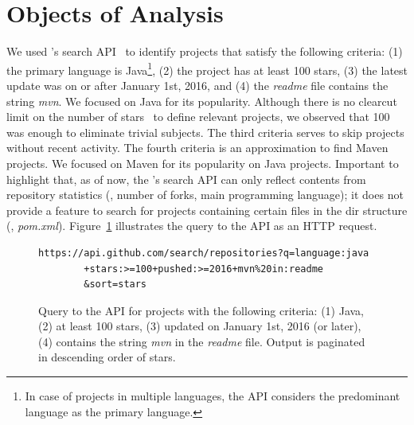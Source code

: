 \section{Objects of Analysis}
\label{sec:subjects}



We used \github{}'s search API~\cite{githubsearch} to identify
projects that satisfy the following criteria: (1) the primary language
is Java\footnote{In case of projects in multiple languages, the
  \github{} API considers the predominant language as the primary
  language.}, (2) the project has at least 100 stars, (3) the latest
update was on or after January 1st, 2016, and (4) the \emph{readme}
file contains the string \emph{mvn}.  We focused on Java for its
popularity.  Although there is no clearcut limit on the number of
\github{} stars~\cite{github-stars} to define relevant projects, we
observed that 100 was enough to eliminate trivial subjects. The third
criteria serves to skip projects without recent activity. The fourth
criteria is an approximation to find Maven projects. We focused on Maven for its popularity on
Java projects.  Important to highlight that, as of now, the
\github{}'s search API can only reflect contents from repository
statistics (\eg, number of forks, main programming language); it does
not provide a feature to search for projects containing certain files
in the dir structure (\eg{}, \emph{pom.xml}).
Figure~\ref{fig:subject-query} illustrates the query to the \github{}
API as an HTTP request.  

\vspace{1ex}
\begin{figure}[h!]
\centering
\scriptsize
{}
\begin{lstlisting}
https://api.github.com/search/repositories?q=language:java
        +stars:>=100+pushed:>=2016+mvn%20in:readme
        &sort=stars
\end{lstlisting}
  \caption{\label{fig:subject-query} Query to the \github{} API for
  projects with the following criteria: (1) Java, (2) at least 100
  stars, (3) updated on January 1st, 2016 (or later), (4) contains
  the string \emph{mvn} in the \emph{readme} file. Output is
  paginated in descending order of stars.}
\end{figure}

